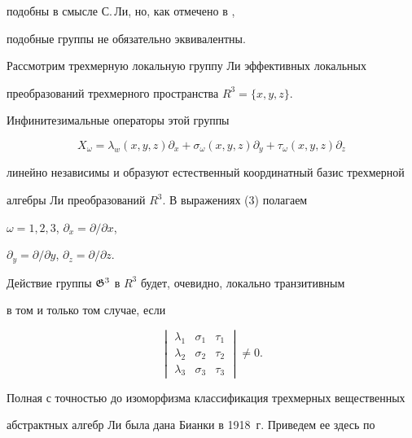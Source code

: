 подобны в смысле С.\,Ли, но, как отмечено в \cite{Bre}, 


подобные группы не обязательно эквивалентны. 


 


Рассмотрим трехмерную локальную группу Ли эффективных локальных 


преобразований трехмерного пространства $R^3=\{x,y,z\}$. 


Инфинитезимальные операторы этой группы 


\begin{equation} 


X_\omega=\lambda_w(x,y,z)\partial_x+ 


\sigma_\omega(x,y,z)\partial_y+ 


\tau_\omega(x,y,z)\partial_z 


\end{equation} 


линейно независимы и образуют естественный координатный базис трехмерной 


алгебры Ли преобразований $R^3$. В выражениях (3) полагаем 


$\omega=1,2,3$, $\partial_x=\partial/\partial x$, 


$\partial_y=\partial/\partial y$, $\partial_z=\partial/\partial z$. 


Действие группы $\frak G^3$ в $R^3$ будет, очевидно, локально транзитивным 


в том и только том случае, если 


\begin{equation} 


\begin{vmatrix} 


\lambda_1 & \sigma_1 & \tau_1\\ 


\lambda_2 & \sigma_2 & \tau_2\\ 


\lambda_3 & \sigma_3 & \tau_3 


\end{vmatrix} 


\ne 0. 


\end{equation} 


 


Полная с точностью до изоморфизма классификация трехмерных вещественных 


абстрактных алгебр Ли была дана Бианки в 1918~г. Приведем ее здесь по 


